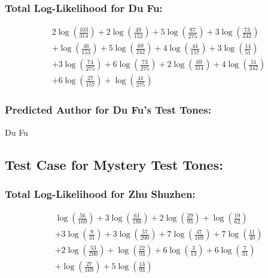 \documentclass[12pt]{article}
\begin{document}
\subsubsection*{Total Log-Likelihood for Du Fu:}

\[
\begin{aligned}
    &2 \log\left(\frac{103}{314}\right) + 2 \log\left(\frac{49}{153}\right) + 5 \log\left(\frac{87}{275}\right) + 3 \log\left(\frac{73}{242}\right) \\
    &+ \log\left(\frac{46}{153}\right) + 5 \log\left(\frac{69}{242}\right) + 4 \log\left(\frac{44}{157}\right) + 3 \log\left(\frac{14}{51}\right) \\
    &+ 3 \log\left(\frac{74}{275}\right) + 6 \log\left(\frac{73}{275}\right) + 2 \log\left(\frac{69}{314}\right) + 4 \log\left(\frac{51}{242}\right) \\
    &+ 6 \log\left(\frac{27}{157}\right) + \log\left(\frac{41}{275}\right)
\end{aligned}
\]

\subsubsection*{Predicted Author for Du Fu's Test Tones: }
Du Fu

\subsection*{Test Case for Mystery Test Tones: }

\subsubsection*{Total Log-Likelihood for Zhu Shuzhen:}

\[
\begin{aligned}
    &\log\left(\frac{56}{169}\right) + 3 \log\left(\frac{61}{186}\right) + 2 \log\left(\frac{29}{93}\right) + \log\left(\frac{19}{62}\right) \\
    &+ 3 \log\left(\frac{9}{31}\right) + 3 \log\left(\frac{57}{200}\right) + 7 \log\left(\frac{47}{169}\right) + 7 \log\left(\frac{11}{40}\right) \\
    &+ 2 \log\left(\frac{53}{200}\right) + \log\left(\frac{22}{93}\right) + 6 \log\left(\frac{3}{13}\right) + 6 \log\left(\frac{7}{31}\right) \\
    &+ \log\left(\frac{27}{169}\right) + 5 \log\left(\frac{13}{93}\right)
\end{aligned}
\]
\end{document}

